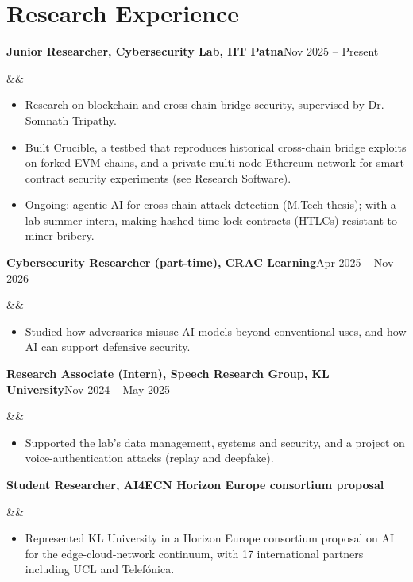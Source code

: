 \documentclass[10pt]{article}
\newcommand{\entry}[3]{%
  \textbf{#1}\hfill{\color{muted}#2}\par
  \ifx&#3&\else{\itshape #3}\par\fi\vspace{-0.1em}}
\begin{document}
\section{Research Experience}
\entry{Junior Researcher, Cybersecurity Lab, IIT Patna}{Nov 2025 -- Present}{}
\begin{itemize}
  \item Research on blockchain and cross-chain bridge security, supervised by Dr. Somnath Tripathy.
  \item Built Crucible, a testbed that reproduces historical cross-chain bridge exploits on forked EVM chains, and a private multi-node Ethereum network for smart contract security experiments (see Research Software).
  \item Ongoing: agentic AI for cross-chain attack detection (M.Tech thesis); with a lab summer intern, making hashed time-lock contracts (HTLCs) resistant to miner bribery.
\end{itemize}
\vspace{0.3em}
\entry{Cybersecurity Researcher (part-time), CRAC Learning}{Apr 2025 -- Nov 2026}{}
\begin{itemize}
  \item Studied how adversaries misuse AI models beyond conventional uses, and how AI can support defensive security.
\end{itemize}
\vspace{0.3em}
\entry{Research Associate (Intern), Speech Research Group, KL University}{Nov 2024 -- May 2025}{}
\begin{itemize}
  \item Supported the lab's data management, systems and security, and a project on voice-authentication attacks (replay and deepfake).
\end{itemize}
\vspace{0.3em}
\entry{Student Researcher, AI4ECN Horizon Europe consortium proposal}{}{}
\begin{itemize}
  \item Represented KL University in a Horizon Europe consortium proposal on AI for the edge-cloud-network continuum, with 17 international partners including UCL and Telefónica.
\end{itemize}
\end{document}
